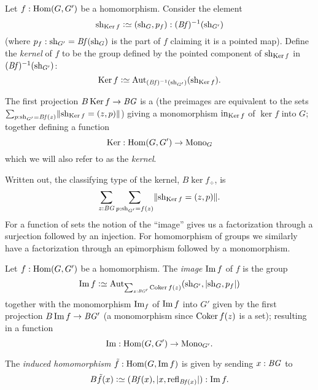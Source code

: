 \begin{definition}
  \label{def:kernel}
Let $f:\Hom(G,G')$  be a homomorphism.
Consider the element 
$$\sh_{\ker f}\defequi(\sh_G,p_f):(\Bf)^{-1}(\sh_{G'})$$ (where $p_f:\mathrm{sh}_{G'}=\mathit{B}\mathit{f}(\mathrm{sh}_G)$ is the part of $f$ claiming it is a pointed map). 
Define the \emph{kernel}  of $f$ to be the group defined by the pointed component  of $\sh_{\ker f}$ in $(\mathit{B}\mathit{f})^{-1}(\mathrm{sh}_{G'})$:
$$\ker f\defequi \aut_{(\Bf)^{-1}(\sh_{G'})}(\sh_{\ker f}).
$$ 

The first projection $B\ker f\to \BG$ is a \covering (the preimages are equivalent to the sets $\sum_{p:\sh_{G'}=\Bf(z)}\Trunc{\sh_{\ker f}=(z,p)}$) giving a monomorphism
$\incl_{\ker f}$ of $\ker f$ into $G$; together defining a function
$$\ker:\Hom(G,G')\to\typemono_G$$
which we will also refer to as the \emph{kernel}.
\end{definition}
Written out, the classifying type of the kernel,
$B\ker f_\div$, is $$\sum_{z:\BG}\sum_{p:\sh_{G'}=f(z)}\Trunc{\sh_{\ker f}=(z,p)}.$$
For a function of sets the notion of the ``image'' gives us a factorization through a surjection followed by an injection.  For homomorphism of groups we similarly have a factorization through an epimorphism followed by a monomorphism.
\begin{definition}
  \label{def:image}
  Let $f:\Hom(G,G')$  be a homomorphism.
  The \emph{image} $\image f$ of $f$ is the group
  $$\image f\defequi \aut_{\sum_{z:\BG'}\coker f(z)}(\sh_{G'},|\sh_G,p_f|)$$
  together with the monomorphism $\image_f$ of $\image f$ into $G'$ given by the first projection $B\image f\to \BG'$ (a monomorphism since $\coker f(z)$ is a set); resulting in a function
  $$\image:\Hom(G,G')\to\typemono_{G'}.$$


The \emph{induced homomorphism} $\tilde f:\Hom(G,\image f)$ is given by sending $x:\mathit{B}\mathit{G}$ to
$$B\tilde f(x)\defequi (\Bf(x),|x,\refl{\Bf(x)}|):\image f.$$ 

\end{definition}


